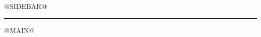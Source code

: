 \documentclass[11pt,letterpaper]{article}
\begin{document}
\fontsize{11}{14}\selectfont
\begin{lrbox}{\sidebar}
\begin{minipage}[t]{142bp}
\raggedright
\vspace{0pt}
@SIDEBAR@
\end{minipage}
\end{lrbox}
\begin{lrbox}{}
\begin{minipage}[t]{316bp}
\raggedright
\vspace{0pt}
\hrule height 2bp
\vspace{4bp}
@MAIN@
\end{minipage}
\end{lrbox}
\ifdim\dimexpr\ht\sidebar+\dp\sidebar\relax>\textheight
\typeout{Overfull \vbox: cover letter sidebar exceeds page height}
\fi
\ifdim\dimexpr\ht\letterbody+\dp\letterbody\relax>\textheight
\typeout{Overfull \vbox: cover letter body exceeds page height}
\fi
\noindent\usebox{\sidebar}\hspace{38bp}
\end{document}
